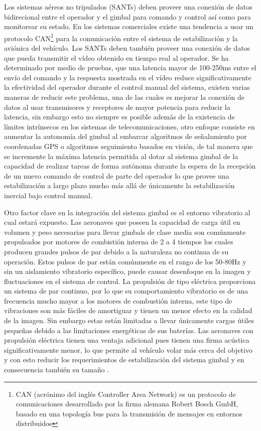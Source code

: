 Los sistemas a\'{e}reos no tripulados (SANTs) deben proveer una conexi\'{o}n de datos bidirecional entre el operador y el gimbal para comando y control as\'{i} como para monitorear su estado. En los sistemas comerciales existe una tendencia a usar un protocolo CAN\footnote{CAN (acr\'{o}nimo del ingl\'{e}s Controller Area Network) es un protocolo de comunicaciones desarrollado por la firma alemana Robert Bosch GmbH, basado en una topolog\'{i}a bus para la transmisi\'{o}n de mensajes en entornos distribuidos} para la comunicaci\'{o}n entre el sistema de estabilizaci\'{o}n y la avi\'{o}nica del veh\'{i}culo. Los SANTs deben tambi\'{e}n proveer una conexi\'{o}n de datos que pueda transmitir el v\'{i}deo obtenido en tiempo real al operador. Se ha determinado por medio de pruebas, que una latencia mayor de 100-250ms entre el env\'{i}o del comando y la respuesta mostrada en el v\'{i}deo reduce significativamente la efectividad del operador durante el control manual del sistema, existen varias maneras de reducir este problema, una de las cuales es mejorar la conexi\'{o}n de datos al usar transmisores y receptores de mayor potencia para reducir la latencia, sin embargo esto no siempre es posible adem\'{a}s de la existencia de l\'{i}mites intr\'{i}nsecos en los sistemas de telecomunicaciones, otro enfoque consiste en aumentar la autonom\'{i}a del gimbal al embarcar algoritmos de se\~{n}alamiento por coordenadas GPS o algoritmos seguimiento basados en visi\'{o}n, de tal manera que se incremente la m\'{a}xima latencia permitida al dotar al sistema gimbal de la capacidad de realizar tareas de forma aut\'{o}noma durante la espera de la recepci\'{o}n de un nuevo comando de control de parte del operador lo que provee una estabilizaci\'{o}n a largo plazo mucho m\'{a}s all\'{a} de \'{u}nicamente la estabilizaci\'{o}n inercial bajo control manual. 

Otro factor clave en la integraci\'{o}n del sistema gimbal es el entorno vibratorio al cual estar\'{a} expuesto. Las aeronaves que poseen la capacidad de carga \'{u}til en volumen y peso necesarias para llevar gimbals de clase media son com\'{u}nmente propulsados por motores de combisti\'{o}n interna de 2 a 4 tiempos los cuales producen grandes pulsos de par debido a la naturaleza no continua de su operaci\'{o}n. Estos pulsos de par est\'{a}n com\'{u}nmente en el rango de los 50-80Hz y sin un aislamiento vibratorio espec\'{i}fico, puede causar desenfoque en la imagen y fluctuaciones en el sistema de control. La propulsi\'{o}n de tipo el\'{e}ctrica proporciona un sistema de par continuo, por lo que su comportamiento vibratorio es de una frecuencia mucho mayor a los motores de combusti\'{o}n interna, este tipo de vibraciones son m\'{a}s f\'{a}ciles de amortiguar y tienen un menor efecto en la calidad de la imagen. Sin embargo estas est\'{a}n limitadas a llevar \'{u}nicamente cargas \'{u}tiles peque\~{n}as debido a las limitaciones energ\'{e}ticas de sus bater\'{i}as. Las aeronaves con propulsi\'{o}n el\'{e}ctrica tienen una ventaja adicional pues tienen una firma ac\'{u}stica significativamente menor, lo que permite al veh\'{i}culo volar m\'{a}s cerca del objetivo y con esto reducir los requerimientos de estabilizaci\'{o}n del sistema gimbal y en consecuencia tambi\'{e}n su tama\~{n}o .

